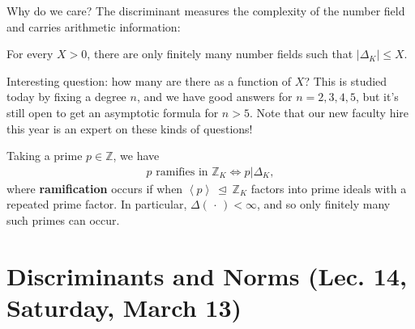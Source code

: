 \begin{remark}

Why do we care? The discriminant measures the complexity of the number
field and carries arithmetic information:

\begin{theorem}[Hermite]

For every \(X>0\), there are only finitely many number fields such that
\({\left\lvert { {\Delta}_K } \right\rvert} \leq X\).

\end{theorem}

\begin{remark}

Interesting question: how many are there as a function of \(X\)? This is
studied today by fixing a degree \(n\), and we have good answers for
\(n=2,3,4,5\), but it's still open to get an asymptotic formula for
\(n>5\). Note that our new faculty hire this year is an expert on these
kinds of questions!

\end{remark}

\begin{theorem}[Dedekind]

Taking a prime \(p\in {\mathbb{Z}}\), we have
\begin{align*}
p \text{ ramifies in } {\mathbb{Z}}_K \iff p \mathrel{\Big|}{\Delta}_K
,\end{align*}
where \textbf{ramification} occurs if when
\(\left\langle{ p }\right\rangle{~\trianglelefteq~}{\mathbb{Z}}_K\)
factors into prime ideals with a repeated prime factor. In particular,
\({\Delta}({\,\cdot\,}) < \infty\), and so only finitely many such
primes can occur.

\end{theorem}

\end{remark}

\hypertarget{discriminants-and-norms-lec.-14-saturday-march-13}{%
\section{Discriminants and Norms (Lec. 14, Saturday, March
13)}\label{discriminants-and-norms-lec.-14-saturday-march-13}}

